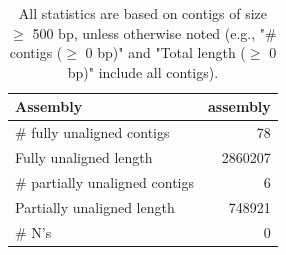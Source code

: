 \documentclass[12pt,a4paper]{article}
\begin{document}
\begin{table}[ht]
\begin{center}
\caption{All statistics are based on contigs of size $\geq$ 500 bp, unless otherwise noted (e.g., "\# contigs ($\geq$ 0 bp)" and "Total length ($\geq$ 0 bp)" include all contigs).}
\begin{tabular}{|l*{1}{|r}|}
\hline
Assembly & assembly \\ \hline
\# fully unaligned contigs & 78 \\ \hline
Fully unaligned length & 2860207 \\ \hline
\# partially unaligned contigs & 6 \\ \hline
Partially unaligned length & 748921 \\ \hline
\# N's & 0 \\ \hline
\end{tabular}
\end{center}
\end{table}
\end{document}
